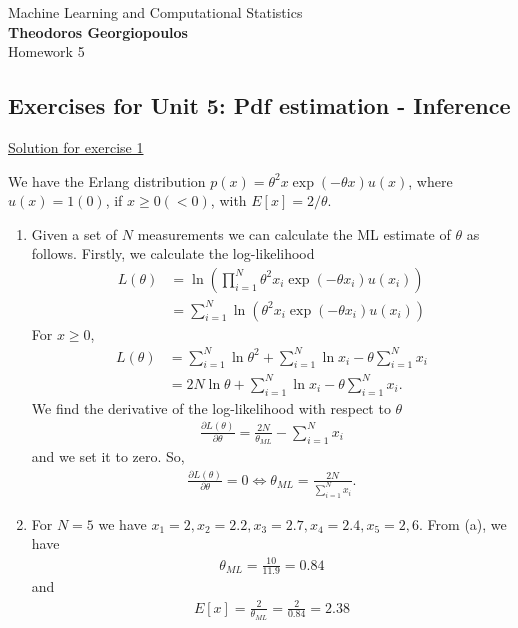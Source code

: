 \documentclass[12pt]{book}
\begin{document}
\begin{center}
{\Large Machine Learning and Computational Statistics}\\
\large\textbf{Theodoros Georgiopoulos}\\ %
\Large Homework 5 %
\end{center}

\vspace{0.2 cm}
\subsection*{Exercises for Unit 5: Pdf estimation - Inference}
\vspace{0.2 cm}

{\underline{\large Solution for exercise 1}}
\vspace{0.1 cm}

\noindent

We have the Erlang distribution $p(x) = \theta^2 x \exp(-\theta x) u(x)$, where $u(x)=1(0)$, if $x\geq 0(< 0)$, with $E[x] = 2/ \theta$.
\begin{enumerate}[label=(\alph*)]
	\item Given a set of $N$ measurements we can calculate the ML estimate of $\theta$ as follows. Firstly, we calculate the log-likelihood
	\begin{align*}
	L(\theta) &=\ln \left( \prod_{i=1}^{N}\theta^2 x_i \exp(-\theta x_i) u(x_i) \right) \\
	&= \sum_{i=1}^{N} \ln \left(\theta^2 x_i \exp(-\theta x_i) u(x_i) \right)
	\end{align*}
	For $x\geq0$,
	\begin{align*}
	L(\theta) &= \sum_{i=1}^{N} \ln\theta^2 + \sum_{i=1}^{N}\ln x_i - \theta \sum_{i=1}^{N}x_i \\ 
	&= 2N\ln\theta + \sum_{i=1}^{N}\ln x_i - \theta \sum_{i=1}^{N}x_i .
	\end{align*}
	We find the derivative of the log-likelihood with respect to $\theta$
	\begin{align*}
	\frac{\partial L(\theta)}{\partial \theta} = \frac{2N}{\theta_{ML}} - \sum_{i=1}^{N} x_i
	\end{align*}
	and we set it to zero. So,
	\begin{align*}
	\frac{\partial L(\theta)}{\partial \theta} = 0  \iff \theta_{ML} = \frac{2N}{\sum_{i=1}^{N} x_i}.
	\end{align*}
	\item For $N=5$ we have $x_1=2, x_2=2.2, x_3=2.7, x_4=2.4, x_5=2,6$. From (a), we have
	\begin{align*}
	\theta_{ML} = \frac{10}{11.9} = 0.84
	\end{align*}
	and
	\begin{align*}
	E[x] = \frac{2}{\theta_{ML}} = \frac{2}{0.84} = 2.38
	\end{align*}
\end{enumerate}
\end{document}
